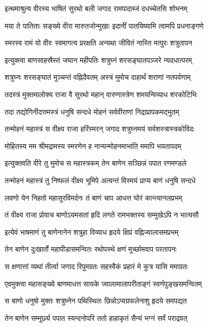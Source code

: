 \twolineshloka
{इत्थमाश्रुत्य वीरस्य भाषितं सुरथो बली}
{जगाद रामपादाब्जं दधच्चेतसि शोभनम्}%

\twolineshloka
{मया ते पातिताः सङ्ख्ये वीरा मारुतजोन्मुखाः}
{इदानीं पातयिष्यामि त्वामपि प्रधनाङ्गणे}%

\twolineshloka
{स्मरस्व रामं यो वीरः स्वमागत्य प्ररक्षति}
{अन्यथा जीवितं नास्ति मत्पुरः शत्रुतापन}%

\twolineshloka
{इत्युक्त्वा बाणसाहस्रैस्तं जघान महीपतिः}
{शत्रुघ्नं शरसङ्घातपञ्जरे न्यदधात्परम्}%

\twolineshloka
{शत्रुघ्नः शरसङ्घातं मुञ्चन्तं वह्निदैवतम्}
{अस्त्रं मुमोच दाहार्थं शराणां नतपर्वणाम्}%

\twolineshloka
{तदस्त्रं मुक्तमालोक्य राजा वै सुरथो महान्}
{वारुणास्त्रेण शमयन्विव्याध शरकोटिभिः}%

\twolineshloka
{तदा तद्योगिनीदत्तमस्त्रं धनुषि सन्दधे}
{मोहनं सर्ववीराणां निद्राप्रापकमद्भुतम्}%

\twolineshloka
{तन्मोहनं महास्त्रं स वीक्ष्य राजा हरिंस्मरन्}
{जगाद शत्रुघ्नमयं सर्वशस्त्रास्त्रकोविदः}%

\twolineshloka
{मोहितस्य मम श्रीमद्रामस्य स्मरणेन ह}
{नान्यन्मोहनमाभाति ममापि भयतापदम्}%

\twolineshloka
{इत्युक्तवति वीरे तु मुमोच स महास्त्रकम्}
{तेन बाणेन सञ्छिन्नं पपात रणमण्डले}%

\twolineshloka
{तन्मोहनं महास्त्रं तु निष्फलं वीक्ष्य भूमिपे}
{अत्यन्तं विस्मयं प्राप्य बाणं धनुषि सन्दधे}%

\twolineshloka
{लवणो येन निहतो महासुरविमर्दनः}
{तं बाणं चाप आधत्त घोरं कान्त्यानलप्रभम्}%

\twolineshloka
{तं वीक्ष्य राजा प्रोवाच बाणोऽयमसतां हृदि}
{लगते रामभक्तस्य सम्मुखेऽपि न भात्यसौ}%

\twolineshloka
{इत्येवं भाषमाणं तु बाणेनानेन शत्रुहा}
{विव्याध हृदये क्षिप्रं वह्निज्वालासमप्रभम्}%

\twolineshloka
{तेन बाणेन दुःखार्तो महापीडासमन्वितः}
{रथोपस्थे क्षणं मूर्च्छामवाप परतापनः}%

\twolineshloka
{स क्षणात्तां व्यथां तीर्त्वा जगाद रिपुमग्रतः}
{सहस्वैकं प्रहारं मे कुत्र यासि ममाग्रतः}%

\twolineshloka
{एवमुक्त्वा महासङ्ख्ये बाणमाधत्त सायके}
{ज्वालामालापरीताङ्गं स्वर्णपुङ्खसमन्वितम्}%

\twolineshloka
{स बाणो धनुषो मुक्तः शत्रुघ्नेन पथिस्थितः}
{छिन्नोऽप्यग्रफलेनाशु हृदये समपद्यत}%

\twolineshloka
{तेन बाणेन सम्मूर्छ्य पपात स्यन्दनोपरि}
{ततो हाहाकृतं सैन्यं भग्नं सर्वं पराद्रवत्}%

